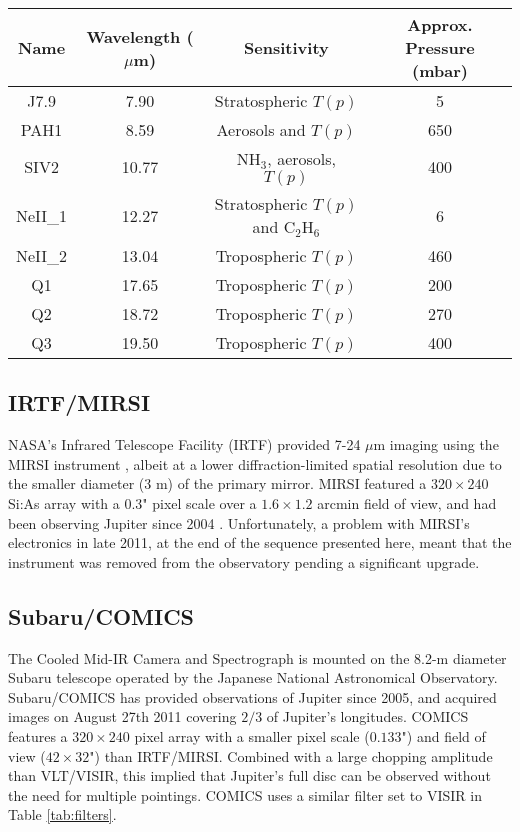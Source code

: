 \documentclass[final,authoryear,5p,times,twocolumn]{elsarticle}
\begin{document}
\begin{table*}[htdp]
\caption{VLT/VISIR Filters used in this study.  Approximate peaks of the filter contribution functions are based on \citet{09fletcher_imaging}.}
\begin{center}
\begin{tabular}{|c|c|c|c|}
\hline
Name & Wavelength ($\mu$m) & Sensitivity & Approx. Pressure (mbar) \\
\hline
J7.9 & 7.90 & Stratospheric $T(p)$ & 5 \\
PAH1 & 8.59 & Aerosols and $T(p)$ & 650\\
SIV2 & 10.77 & NH$_3$, aerosols, $T(p)$ & 400 \\
NeII\_1 & 12.27 & Stratospheric $T(p)$ and C$_2$H$_6$ & 6 \\
NeII\_2 & 13.04 & Tropospheric $T(p)$ & 460 \\
Q1 & 17.65 & Tropospheric $T(p)$ & 200 \\
Q2 & 18.72 & Tropospheric $T(p)$ & 270 \\
Q3 & 19.50 & Tropospheric $T(p)$ & 400 \\
\hline
\end{tabular}
\end{center}
\label{tab:filters}
\end{table*}%

\subsection{IRTF/MIRSI}
NASA's Infrared Telescope Facility (IRTF) provided 7-24 $\mu$m imaging using the MIRSI instrument \citep[Mid Infrared Spectrometer and Imager,][]{03deutsch}, albeit at a lower diffraction-limited spatial resolution due to the smaller diameter (3 m) of the primary mirror.    MIRSI featured a $320\times240$ Si:As array with a 0.3" pixel scale over a $1.6\times1.2$ arcmin field of view, and had been observing Jupiter since 2004 \citep{10fletcher_grs}.  Unfortunately, a problem with MIRSI's electronics in late 2011, at the end of the sequence presented here, meant that the instrument was removed from the observatory pending a significant upgrade. 

\subsection{Subaru/COMICS}
The Cooled Mid-IR Camera and Spectrograph \citep[COMICS,][]{00kataza} is mounted on the 8.2-m diameter Subaru telescope operated by the Japanese National Astronomical Observatory.  Subaru/COMICS has provided observations of Jupiter since 2005, and acquired images on August 27th 2011 covering $2/3$ of Jupiter's longitudes.  COMICS features a $320\times240$ pixel array with a smaller pixel scale ($0.133$") and field of view ($42\times32$") than IRTF/MIRSI. Combined with a large chopping amplitude than VLT/VISIR, this implied that Jupiter's full disc can be observed without the need for multiple pointings.  COMICS uses a similar filter set to VISIR in Table \ref{tab:filters}.
\end{document}
